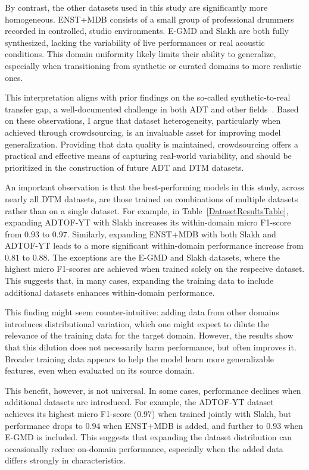 By contrast, the other datasets used in this study are significantly more homogeneous. ENST+MDB consists of a small group of professional drummers recorded in controlled, studio environments. E-GMD and Slakh are both fully synthesized, lacking the variability of live performances or real acoustic conditions. This domain uniformity likely limits their ability to generalize, especially when transitioning from synthetic or curated domains to more realistic ones.

This interpretation aligns with prior findings on the so-called synthetic-to-real transfer gap, a well-documented challenge in both \gls{ADT} and other fields~\cite{zehren2024analyzingreducingsynthetictorealtransfer}. Based on these observations, I argue that dataset heterogeneity, particularly when achieved through crowdsourcing, is an invaluable asset for improving model generalization. Providing that data quality is maintained, crowdsourcing offers a practical and effective means of capturing real-world variability, and should be prioritized in the construction of future \gls{ADT} and \gls{DTM} datasets.

An important observation is that the best-performing models in this study, across nearly all \gls{DTM} datasets, are those trained on combinations of multiple datasets rather than on a single dataset. For example, in Table~\ref{DatasetResultsTable}, expanding ADTOF-YT with Slakh increases its within-domain micro F1-score from $0.93$ to $0.97$. Similarly, expanding ENST+MDB with both Slakh and ADTOF-YT leads to a more significant within-domain performance increase from $0.81$ to $0.88$. The exceptions are the E-GMD and Slakh datasets, where the highest micro F1-scores are achieved when trained solely on the respecive dataset. This suggests that, in many cases, expanding the training data to include additional datasets enhances within-domain performance.

This finding might seem counter-intuitive: adding data from other domains introduces distributional variation, which one might expect to dilute the relevance of the training data for the target domain. However, the results show that this dilution does not necessarily harm performance, but often improves it. Broader training data appears to help the model learn more generalizable features, even when evaluated on its source domain. 

This benefit, however, is not universal. In some cases, performance declines when additional datasets are introduced. For example, the ADTOF-YT dataset achieves its highest micro F1-score ($0.97$) when trained jointly with Slakh, but performance drops to $0.94$ when ENST+MDB is added, and further to $0.93$ when E-GMD is included. This suggests that expanding the dataset distribution can occasionally reduce on-domain performance, especially when the added data differs strongly in characteristics.

